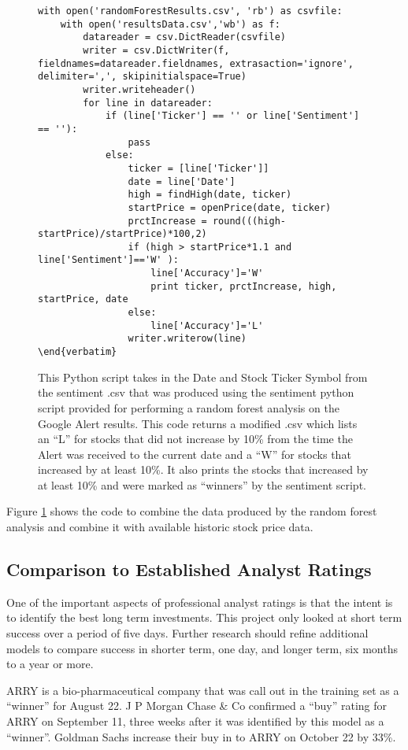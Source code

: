 \documentclass[sigconf]{acmart}
\begin{document}
\begin{figure}[htb]
\begin{lstlisting}
with open('randomForestResults.csv', 'rb') as csvfile:
	with open('resultsData.csv','wb') as f:
		datareader = csv.DictReader(csvfile)
		writer = csv.DictWriter(f, fieldnames=datareader.fieldnames, extrasaction='ignore', delimiter=',', skipinitialspace=True)
		writer.writeheader()
		for line in datareader:
			if (line['Ticker'] == '' or line['Sentiment'] == ''):
				pass
			else:
				ticker = [line['Ticker']]
				date = line['Date']
				high = findHigh(date, ticker)
				startPrice = openPrice(date, ticker)
				prctIncrease = round(((high-startPrice)/startPrice)*100,2)
				if (high > startPrice*1.1 and line['Sentiment']=='W' ):
					line['Accuracy']='W'
					print ticker, prctIncrease, high, startPrice, date
				else:
					line['Accuracy']='L'
				writer.writerow(line)
\end{verbatim}
\end{lstlisting}
\caption{This Python script takes in the Date and Stock Ticker Symbol from the sentiment .csv that was produced using the sentiment python script provided for performing a random forest analysis on the Google Alert results. This code returns a modified .csv which lists an ``L'' for stocks that did not increase by 10\% from the time the Alert was received to the current date and a ``W'' for stocks that increased by at least 10\%. It also prints the stocks that increased by at least 10\%  and were marked as ``winners'' by the sentiment script.}\label{c:result}
\end{figure}

Figure \ref{c:result} shows the code to combine the data produced by the random forest analysis and combine it with available historic stock price data.

\subsection{Comparison to Established Analyst Ratings}
One of the important aspects of professional analyst ratings is that the intent is to identify the best long term investments. This project only looked at short term success over a period of five days. Further research should refine additional models to compare success in shorter term, one day, and longer term, six months to a year or more.

ARRY is a bio-pharmaceutical company that was call out in the training set as a ``winner'' for August 22. J P Morgan Chase \& Co confirmed a ``buy'' rating for ARRY on September 11, three weeks after it was identified by this model as a ``winner''. Goldman Sachs increase their buy in to ARRY  on October 22 by 33\%. 
\end{document}
